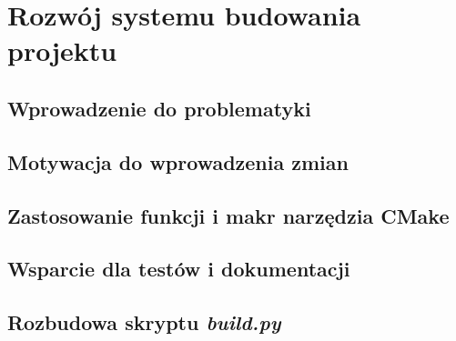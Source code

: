 \clearpage
\section{Rozwój systemu budowania projektu}
\label{ch:building_project}

\subsection{Wprowadzenie do problematyki}

\subsection{Motywacja do wprowadzenia zmian}

\subsection{Zastosowanie funkcji i makr narzędzia CMake}

\subsection{Wsparcie dla testów i dokumentacji}

\subsection{Rozbudowa skryptu \emph{build.py}}

